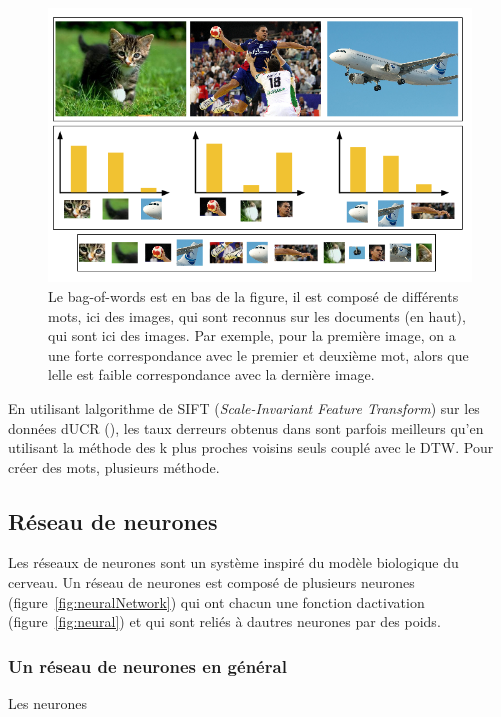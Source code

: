 \documentclass[11pt,final,ENIB]{sdm}
\begin{document}
			\begin{figure}[!ht]
				\centering
				\includegraphics[scale=0.5,natwidth=680,natheight=440]{figures/bagOfWords.png}
				\caption{Le bag-of-words est en bas de la figure, il est compos\'e de diff\'erents mots, ici des images, qui sont reconnus sur les documents (en haut), qui sont ici des images. Par exemple, pour la premi\`ere image, on a une forte correspondance avec le premier et deuxi\`eme mot, alors que l\textquotesingle elle est faible correspondance avec la derni\`ere image.}
				\label{fig:BoW}
			\end{figure}

			En utilisant l\textquotesingle algorithme de SIFT (\textit{Scale-Invariant Feature Transform}) sur les donn\'ees d\textquotesingle UCR (\cite{UCRArchive}), les taux d\textquotesingle erreurs obtenus dans \cite{bailly2015bag} sont parfois meilleurs qu'en utilisant la m\'ethode des k plus proches voisins seuls coupl\'e avec le DTW.
			Pour cr\'eer des mots, plusieurs m\'ethode.

	\subsection{R\'eseau de neurones}
	\label{seq:neuralNetwork}
		Les r\'eseaux de neurones sont un syst\`eme inspir\'e du mod\`ele biologique du cerveau. Un r\'eseau de neurones est compos\'e de plusieurs neurones (figure~\ref{fig:neuralNetwork}) qui ont chacun une fonction d\textquotesingle activation (figure~\ref{fig:neural}) et qui sont reli\'es \`a d\textquotesingle autres neurones par des poids.

		\subsubsection{Un r\'eseau de neurones en g\'en\'eral}
		\label{seq:simpleNeuralNetwork}
			\begin{itshape}Les neurones\end{itshape}
\end{document}
